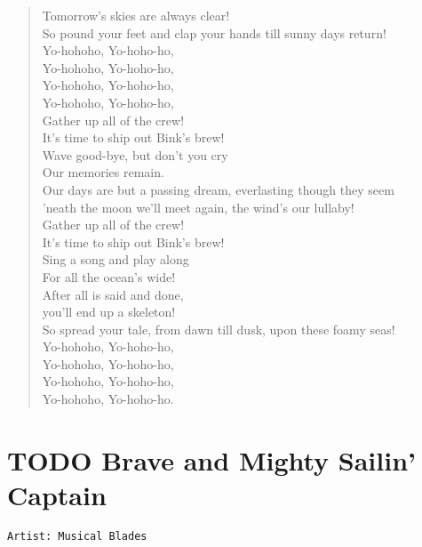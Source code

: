 \documentclass[11pt]{article}
\begin{document}
\begin{verse}
Tomorrow's skies are always clear!\\
So pound your feet and clap your hands till sunny days return!\\
\vspace*{1em}
Yo-hohoho, Yo-hoho-ho,\\
Yo-hohoho, Yo-hoho-ho,\\
Yo-hohoho, Yo-hoho-ho,\\
Yo-hohoho, Yo-hoho-ho,\\
Gather up all of the crew!\\
It's time to ship out Bink's brew!\\
Wave good-bye, but don't you cry\\
Our memories remain.\\
Our days are but a passing dream, everlasting though they seem\\
'neath the moon we'll meet again, the wind's our lullaby!\\
Gather up all of the crew!\\
It's time to ship out Bink's brew!\\
Sing a song and play along\\
For all the ocean's wide!\\
After all is said and done,\\
you'll end up a skeleton!\\
So spread your tale, from dawn till dusk, upon these foamy seas!\\
Yo-hohoho, Yo-hoho-ho,\\
Yo-hohoho, Yo-hoho-ho,\\
Yo-hohoho, Yo-hoho-ho,\\
Yo-hohoho, Yo-hoho-ho.\\
\end{verse}
\clearpage
\section{{\bfseries\sffamily TODO} Brave and Mighty Sailin' Captain}
\label{sec:orgeb5be59}
\begin{verbatim}
Artist: Musical Blades
\end{verbatim}

\clearpage
\end{document}
